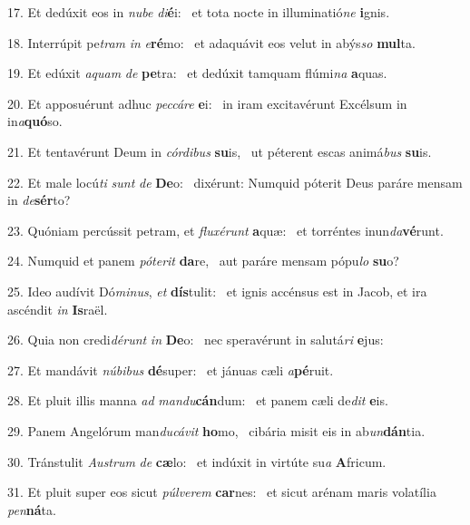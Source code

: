 17. Et dedúxit eos in \textit{nu}\textit{be} \textit{di}\textbf{é}i: \ast\  et tota nocte in illuminatió\textit{ne} \textbf{i}gnis.\

18. Interrúpit pe\textit{tram} \textit{in} \textit{e}\textbf{ré}mo: \ast\  et adaquávit eos velut in abýs\textit{so} \textbf{mul}ta.\

19. Et edúxit \textit{a}\textit{quam} \textit{de} \textbf{pe}tra: \ast\  et dedúxit tamquam flúmi\textit{na} \textbf{a}quas.\

20. Et apposuérunt adhuc \textit{pec}\textit{cá}\textit{re} \textbf{e}i: \ast\  in iram excitavérunt Excélsum in in\textit{a}\textbf{quó}so.\

21. Et tentavérunt Deum in \textit{cór}\textit{di}\textit{bus} \textbf{su}is, \ast\  ut péterent escas animá\textit{bus} \textbf{su}is.\

22. Et male locú\textit{ti} \textit{sunt} \textit{de} \textbf{De}o: \ast\  dixérunt: Numquid póterit Deus paráre mensam in \textit{de}\textbf{sér}to?\

23. Quóniam percússit petram, et \textit{flu}\textit{xé}\textit{runt} \textbf{a}quæ: \ast\  et torréntes inun\textit{da}\textbf{vé}runt.\

24. Numquid et panem \textit{pót}\textit{e}\textit{rit} \textbf{da}re, \ast\  aut paráre mensam pópu\textit{lo} \textbf{su}o?\

25. Ideo audívit Dó\textit{mi}\textit{nus}, \textit{et} \textbf{dís}tulit: \ast\  et ignis accénsus est in Jacob, et ira ascéndit \textit{in} \textbf{Is}raël.\

26. Quia non credi\textit{dé}\textit{runt} \textit{in} \textbf{De}o: \ast\  nec speravérunt in salutá\textit{ri} \textbf{e}jus:\

27. Et mandávit \textit{nú}\textit{bi}\textit{bus} \textbf{dé}super: \ast\  et jánuas cæli \textit{a}\textbf{pé}ruit.\

28. Et pluit illis manna \textit{ad} \textit{man}\textit{du}\textbf{cán}dum: \ast\  et panem cæli de\textit{dit} \textbf{e}is.\

29. Panem Angelórum man\textit{du}\textit{cá}\textit{vit} \textbf{ho}mo, \ast\  cibária misit eis in ab\textit{un}\textbf{dán}tia.\

30. Tránstulit \textit{Aus}\textit{trum} \textit{de} \textbf{cæ}lo: \ast\  et indúxit in virtúte su\textit{a} \textbf{A}fricum.\

31. Et pluit super eos sicut \textit{púl}\textit{ve}\textit{rem} \textbf{car}nes: \ast\  et sicut arénam maris volatília \textit{pen}\textbf{ná}ta.\

